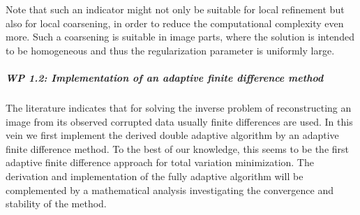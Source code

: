 \documentclass[enabledeprecatedfontcommands,cleardoublepage=empty,headsepline,twoside,11pt,DIV=15,BCOR=12mm,final]{scrartcl}
\begin{document}
Note that such an indicator might not only be suitable for local refinement but also for local coarsening, in order to reduce the computational complexity even more. Such a coarsening is suitable in image parts, where the solution is intended to be homogeneous and thus the regularization parameter is uniformly large.
 
 
 
 
 


 
 \subparagraph{WP 1.2: Implementation of an adaptive finite difference method}
 
 The literature indicates that for solving the inverse problem of reconstructing an image from its observed corrupted data usually finite differences are used. In this vein we first implement the derived double adaptive algorithm by an adaptive finite difference method. To the best of our knowledge, this seems to be the first adaptive finite difference approach for total variation minimization. The derivation and implementation of the fully adaptive algorithm will be complemented by a mathematical analysis investigating the convergence and stability of the method. 
 
\end{document}
